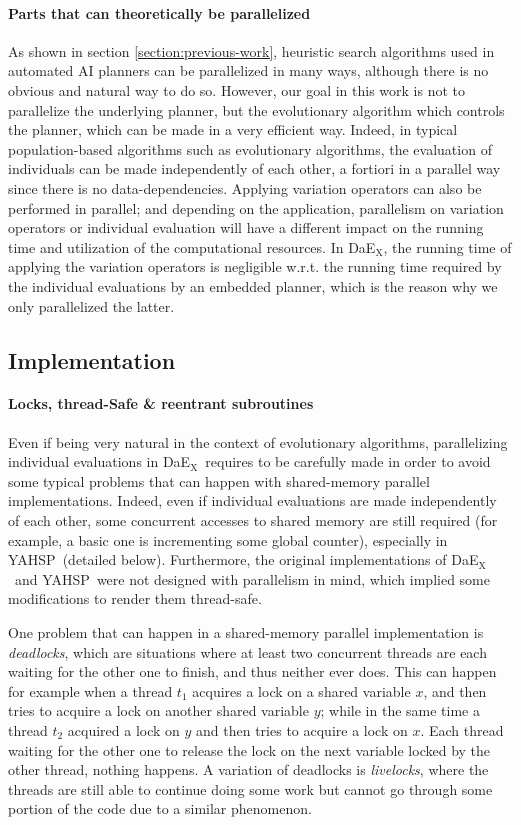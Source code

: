 \documentclass{sig-alternate}
\newcommand{\DAEX}{{\sc DaE$_{\text{X}}$}}
\newcommand{\YAHSP}{{\sc YAHSP}}
\begin{document}
\paragraph{Parts that can theoretically be parallelized}
As shown in section \ref{section:previous-work}, heuristic search algorithms
used in automated AI planners can be parallelized in many ways, although there
is no obvious and natural way to do so. However, our goal in this work is not
to parallelize the underlying planner, but the evolutionary algorithm which
controls the planner, which can be made in a very efficient way. Indeed, in
typical population-based algorithms such as evolutionary algorithms, the
evaluation of individuals can be made independently of each other, a fortiori in
a parallel way since there is no data-dependencies.
Applying variation operators can also be performed in parallel;
and depending on the application, parallelism on variation operators or
individual evaluation will have a different impact on the running time and
utilization of the computational resources.
In \DAEX, the running time of applying the variation operators is negligible w.r.t. the running time required
by the individual evaluations by an embedded planner, which is the reason why we only parallelized the latter.

\subsection{Implementation}

\paragraph{Locks, thread-Safe \& reentrant subroutines}
Even if being very natural in the context of evolutionary algorithms,
parallelizing individual evaluations in \DAEX\ requires to be carefully made in
order to avoid some typical problems that can happen with shared-memory parallel
implementations. Indeed, even if individual evaluations are made
independently of each other, some concurrent accesses to shared memory are still
required (for example, a basic one is incrementing some global counter),
especially in \YAHSP\ (detailed below). Furthermore, the original implementations of \DAEX\
and \YAHSP\ were not designed with parallelism in mind, which implied some
modifications to render them thread-safe.

One problem that can happen in a shared-memory parallel implementation is
\emph{deadlocks}, which are situations where at least two concurrent threads are
each waiting for the other one to finish, and thus neither ever does. This can
happen for example when a thread $t_1$ acquires a lock on a shared variable $x$,
and then tries to acquire a lock on another shared variable $y$; while in the
same time a thread $t_2$ acquired a lock on $y$ and then tries to acquire a lock
on $x$. Each thread waiting for the other one to release the lock on the next
variable locked by the other thread, nothing happens. A variation of deadlocks
is \emph{livelocks}, where the threads are still able to continue doing some
work but cannot go through some portion of the code due to a similar phenomenon.
\end{document}
